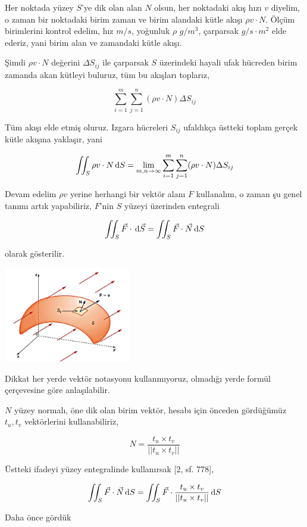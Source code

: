 \documentclass[12pt,fleqn]{article}\usepackage{../../common}
\begin{document}
Her noktada yüzey $S$'ye dik olan alan $N$ olsun, her noktadaki akış hızı $v$
diyelim, o zaman bir noktadaki birim zaman ve birim alandaki kütle akışı $\rho v
\cdot N$. Ölçüm birimlerini kontrol edelim, hız $m/s$, yoğunluk $\rho$ 
$g/m^3$, çarparsak $g/s \cdot m^2$ elde ederiz, yani birim alan ve zamandaki
kütle akışı.

Şimdi $\rho v \cdot N$ değerini $\Delta S_{ij}$ ile çarparsak $S$ üzerindeki
hayali ufak hücreden birim zamanda akan kütleyi buluruz, tüm bu akışları
toplarız,

$$
\sum_{i=1}^{m} \sum_{j=1}^{n} (\rho v \cdot N) \Delta S_{ij}
$$

Tüm akışı elde etmiş oluruz. Izgara hücreleri $S_{ij}$ ufaldıkça üstteki toplam
gerçek kütle akışına yaklaşır, yani

$$
\iint_S \rho v \cdot N \,\mathrm{d} S = \lim_{m,n \to \infty}
\sum_{i=1}^{m} \sum_{j=1}^{n} (\rho v \cdot N) \Delta S_{ij}
$$

Devam edelim $\rho v$ yerine herhangi bir vektör alanı $F$ kullanalım, o zaman
şu genel tanımı artık yapabiliriz, $F$'nin $S$ yüzeyi üzerinden entegrali

$$
\iint_S \vec{F} \cdot \,\mathrm{d} \vec{S} = \iint_S \vec{F} \cdot \vec{N} \,\mathrm{d} S
$$

olarak gösterilir.

\includegraphics[width=15em]{calc_multi_75_app_05.jpg}

Dikkat her yerde vektör notasyonu kullanmıyoruz, olmadığı yerde formül
çerçevesine göre anlaşılabilir.

$N$ yüzey normalı, öne dik olan birim vektör, hesabı için önceden gördüğümüz
$t_u,t_v$ vektörlerini kullanabiliriz,

$$
N = \frac{t_u \times t_v}{ || t_u \times t_v || }
$$

Üstteki ifadeyi yüzey entegralinde kullanırsak [2, sf. 778],

$$
\iint_S \vec{F} \cdot \vec{N} \,\mathrm{d} S =
\iint_S \vec{F} \cdot \frac{t_u \times t_v}{ || t_u \times t_v || } \,\mathrm{d} S
$$

Daha önce gördük
\end{document}
